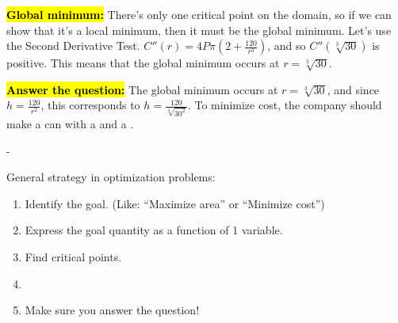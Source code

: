 \documentclass{article}
\makeatletter
\newlength{\tipmargin}
\renewenvironment{framed}{
  \setlength{\tipmargin}{\textwidth-\linewidth}
  \advance\@totalleftmargin-\tipmargin
  \def\FrameCommand{\hspace{\tipmargin}\fbox}%
  \advance\linewidth\tipmargin
  \MakeFramed {\advance\hsize-\width \FrameRestore}%
}
{\endMakeFramed}
\newcommand{\highlight}[1]{\boldmath\hl{\textbf{#1}}\unboldmath}
\makeatother
\begin{document}
\begin{enumerate}
\begin{solution}
        \highlight{Global minimum:} There's only one critical point on the
        domain, so if we can show that it's a local minimum, then it must be
        the global minimum. Let's use the Second Derivative Test. 
        $C''(r) = 4P\pi(2+\frac{120}{r^3})$, and so $C''(\sqrt[3]{30})$ is
        positive. This means that the global minimum occurs at $r=\sqrt[3]{30}$.

        \highlight{Answer the question:} The global minimum occurs
        at $r=\sqrt[3]{30}$, and since $h=\frac{120}{r^2}$, this corresponds to
        $h=\frac{120}{\sqrt[3]{30^2}}$. To minimize cost, the company should make a can with a  and a .
  \end{solution} 

\end{enumerate}
\begin{framed}
  General strategy in optimization problems:
  \begin{enumerate}[nosep]
  \item Identify the goal. (Like: ``Maximize area'' or ``Minimize cost'')
  \item Express the goal quantity as a function of 1 variable.
  \item Find critical points.
  \item[\refstepcounter{enumi}\Pointinghand\ 4.] \

    \pspace{0.25in}

  \item Make sure you answer the question!
  \end{enumerate}
\end{framed}
\end{document}
